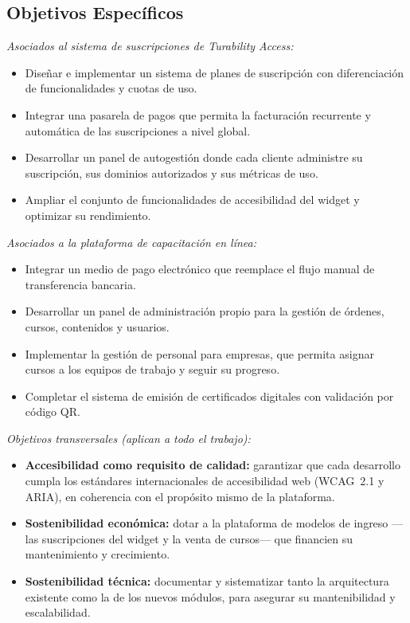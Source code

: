 \documentclass[12pt,a4paper]{article}
\begin{document}
\subsection*{Objetivos Específicos}

\textit{Asociados al sistema de suscripciones de Turability Access:}
\begin{itemize}[leftmargin=1.5cm]
  \item Diseñar e implementar un sistema de planes de suscripción con diferenciación de
        funcionalidades y cuotas de uso.
  \item Integrar una pasarela de pagos que permita la facturación recurrente y automática de
        las suscripciones a nivel global.
  \item Desarrollar un panel de autogestión donde cada cliente administre su suscripción, sus
        dominios autorizados y sus métricas de uso.
  \item Ampliar el conjunto de funcionalidades de accesibilidad del widget y optimizar su
        rendimiento.
\end{itemize}

\textit{Asociados a la plataforma de capacitación en línea:}
\begin{itemize}[leftmargin=1.5cm]
  \item Integrar un medio de pago electrónico que reemplace el flujo manual de transferencia
        bancaria.
  \item Desarrollar un panel de administración propio para la gestión de órdenes, cursos,
        contenidos y usuarios.
  \item Implementar la gestión de personal para empresas, que permita asignar cursos a los
        equipos de trabajo y seguir su progreso.
  \item Completar el sistema de emisión de certificados digitales con validación por código QR.
\end{itemize}

\textit{Objetivos transversales (aplican a todo el trabajo):}
\begin{itemize}[leftmargin=1.5cm]
  \item \textbf{Accesibilidad como requisito de calidad:} garantizar que cada desarrollo cumpla
        los estándares internacionales de accesibilidad web (WCAG~2.1 y ARIA), en coherencia con
        el propósito mismo de la plataforma.
  \item \textbf{Sostenibilidad económica:} dotar a la plataforma de modelos de ingreso —las
        suscripciones del widget y la venta de cursos— que financien su mantenimiento y
        crecimiento.
  \item \textbf{Sostenibilidad técnica:} documentar y sistematizar tanto la arquitectura
        existente como la de los nuevos módulos, para asegurar su mantenibilidad y escalabilidad.
\end{itemize}
\end{document}
